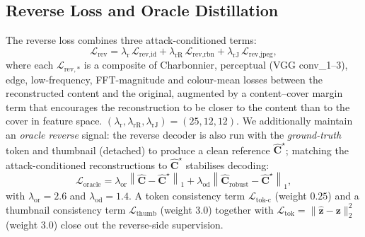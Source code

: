 \documentclass[runningheads]{llncs}
\begin{document}
\subsection{Reverse Loss and Oracle Distillation}
\label{sec:rev}
The reverse loss combines three attack-conditioned terms:
\begin{equation}
    \mathcal{L}_{\text{rev}} = \lambda_{\text{r}}\,\mathcal{L}_{\text{rev,id}} + \lambda_{\text{rR}}\,\mathcal{L}_{\text{rev,rbn}} + \lambda_{\text{rJ}}\,\mathcal{L}_{\text{rev,jpeg}},
    \label{eq:rev}
\end{equation}
where each $\mathcal{L}_{\text{rev},*}$ is a composite of Charbonnier, perceptual (VGG conv\_1--3), edge, low-frequency, FFT-magnitude and colour-mean losses between the reconstructed content and the original, augmented by a content--cover margin term that encourages the reconstruction to be closer to the content than to the cover in feature space. $(\lambda_{\text{r}},\lambda_{\text{rR}},\lambda_{\text{rJ}})=(25,12,12)$. We additionally maintain an \emph{oracle reverse} signal: the reverse decoder is also run with the \emph{ground-truth} token and thumbnail (detached) to produce a clean reference $\hat{\mathbf{C}}^{\star}$; matching the attack-conditioned reconstructions to $\hat{\mathbf{C}}^{\star}$ stabilises decoding:
\begin{equation}
    \mathcal{L}_{\text{oracle}} = \lambda_{\text{or}}\!\left\|\hat{\mathbf{C}}-\hat{\mathbf{C}}^{\star}\right\|_1
    + \lambda_{\text{od}}\!\left\|\hat{\mathbf{C}}_{\text{robust}}-\hat{\mathbf{C}}^{\star}\right\|_1, \label{eq:oracle}
\end{equation}
with $\lambda_{\text{or}}\!=\!2.6$ and $\lambda_{\text{od}}\!=\!1.4$. A token consistency term $\mathcal{L}_{\text{tok-c}}$ (weight $0.25$) and a thumbnail consistency term $\mathcal{L}_{\text{thumb}}$ (weight $3.0$) together with $\mathcal{L}_{\text{tok}}=\|\hat{\mathbf{z}}-\mathbf{z}\|_2^2$ (weight $3.0$) close out the reverse-side supervision.
\end{document}
